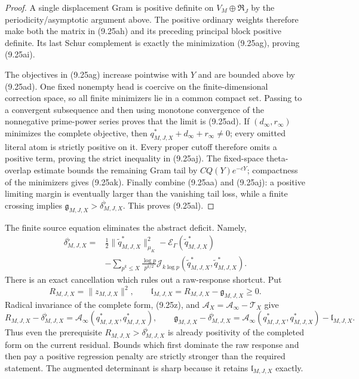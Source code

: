 \documentclass[11pt]{amsart}
\theoremstyle{definition}
\theoremstyle{remark}
\begin{document}
\begin{proof}
A single displacement Gram is positive definite on
\(V_M\oplus\mathfrak R_J\) by the periodicity/asymptotic argument above.
The positive ordinary weights therefore make both the matrix in
(9.25ah) and its preceding principal block positive definite.  Its last
Schur complement is exactly the minimization (9.25ag), proving
(9.25ai).

The objectives in (9.25ag) increase pointwise with \(Y\) and are bounded
above by (9.25ad).  One fixed nonempty head is coercive on the
finite-dimensional correction space, so all finite minimizers lie in a
common compact set.  Passing to a convergent subsequence and then using
monotone convergence of the nonnegative prime-power series proves that
the limit is (9.25ad).  If \((d_\infty,r_\infty)\) minimizes the complete
objective, then \(q_{M,J,X}^*+d_\infty+r_\infty\ne0\); every omitted
literal atom is strictly positive on it.  Every proper cutoff therefore
omits a positive term, proving the strict inequality in (9.25aj).
The fixed-space theta-overlap estimate bounds the remaining Gram tail by
\(CQ(Y)e^{-cY}\); compactness of the minimizers gives (9.25ak).
Finally combine (9.25aa) and (9.25aj): a positive limiting margin is
eventually larger than the vanishing tail loss, while a finite crossing
implies \(\mathfrak g_{M,J,X}>\delta^{\flat}_{M,J,X}\).  This proves (9.25al).
\end{proof}

The finite source equation eliminates the abstract deficit.  Namely,
\[
\boxed{
\begin{aligned}
 \delta^{\flat}_{M,J,X}={}&\frac12\|\widetilde q_{M,J,X}^*\|_{\mu_K}^2
 -\mathscr E_\Gamma(\widetilde q_{M,J,X}^*)\\
 &-\sum_{p^k\le X}\frac{\log p}{p^{k/2}}
 \mathcal J_{k\log p}(\widetilde q_{M,J,X}^*,
                       \widetilde q_{M,J,X}^*).
\end{aligned}}
\tag{9.25am}
\]
There is an exact cancellation which rules out a raw-response shortcut.
Put
\[
 R_{M,J,X}=\|z_{M,J,X}\|^2,
 \qquad
 \mathfrak l_{M,J,X}=R_{M,J,X}-\mathfrak g_{M,J,X}\ge0.
\]
Radical invariance of the complete form, (9.25z), and
\(\mathcal A_X=\mathcal A_\infty-\mathcal T_X\) give
\[
 \boxed{
 R_{M,J,X}-\delta^{\flat}_{M,J,X}
 =\mathcal A_\infty(q_{M,J,X}^*,q_{M,J,X}^*),
 \qquad
 \mathfrak g_{M,J,X}-\delta^{\flat}_{M,J,X}
 =\mathcal A_\infty(q_{M,J,X}^*,q_{M,J,X}^*)
  -\mathfrak l_{M,J,X}.}
\tag{9.25an}
\]
Thus even the prerequisite \(R_{M,J,X}>\delta^{\flat}_{M,J,X}\) is already
positivity of the completed form on the current residual.  Bounds which
first dominate the raw response and then pay a positive regression penalty
are strictly stronger than the required statement.  The augmented
determinant is sharp because it retains \(\mathfrak l_{M,J,X}\) exactly.
\end{document}
